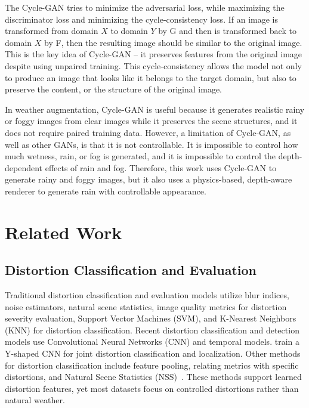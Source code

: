 \documentclass[10pt,letterpaper]{article}
\begin{document}
The Cycle-GAN tries to minimize the adversarial loss, while maximizing the discriminator loss and minimizing
the cycle-consistency loss. If an image is transformed from domain $X$ to domain $Y$ by G and then is transformed back to domain $X$ by F, 
then the resulting image should be similar to the original image. This is the key idea of Cycle-GAN -- it preserves features from the original image despite using unpaired training. This cycle-consistency allows the model not only to produce an image that looks like it belongs to the target domain,
but also to preserve the content, or the structure of the original image\cite{zhuUnpairedImagetoImageTranslation2020}.

In weather augmentation, Cycle-GAN is useful because it generates realistic rainy or foggy images from clear images while it preserves the scene structures, and it does not require paired training data. 
However, a limitation of Cycle-GAN, as well as other GANs, is that it is not controllable. It is impossible to control how much wetness, rain, or fog is generated,
and it is impossible to control the depth-dependent effects of rain and fog\cite{zhuUnpairedImagetoImageTranslation2020,tremblayRainRenderingEvaluating2021}. Therefore, this work uses Cycle-GAN to generate rainy and foggy images, but it also uses
a physics-based, depth-aware renderer to generate rain with controllable appearance.


\FloatBarrier

\section{Related Work}

\subsection{Distortion Classification and Evaluation}

Traditional distortion classification and evaluation models utilize blur indices, noise estimators,
natural scene statistics, image quality metrics for distortion severity evaluation, Support Vector Machines (SVM), and K-Nearest
Neighbors (KNN) for distortion classification\cite{muhammadaliqureshiDistortionClassificationComputer}. Recent distortion classification and
detection models use Convolutional Neural Networks (CNN) and temporal models. \textcite{ahnImageDistortionDetection2017} train a Y-shaped CNN for joint distortion classification and localization. Other methods
for distortion classification include feature pooling, relating metrics with specific distortions,
and Natural Scene Statistics (NSS)~\cite{muhammadaliqureshiDistortionClassificationComputer}. These methods support learned distortion features, yet most
datasets focus on controlled distortions rather than natural
weather.
\end{document}
